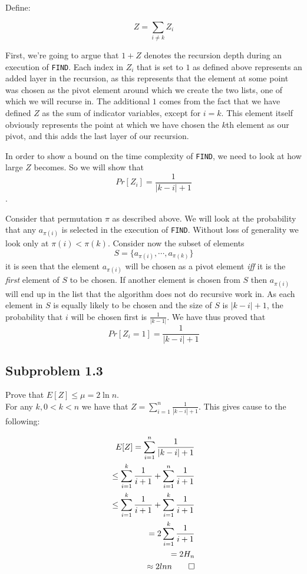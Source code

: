 \documentclass[article,a4paper,oneside]{memoir}
\newcommand{\+}[1]{\ensuremath{\boldsymbol{#1}}}
\begin{document}
Define:

$$Z=\sum_{i\neq k} Z_i$$

First, we're going to argue that $1+Z$ denotes the recursion depth during an execution of \texttt{FIND}. Each index in $Z_i$ that is set to $1$ as defined above represents an added layer in the recursion, as this represents that the element at some point was chosen as the pivot element around which we create the two lists, one of which we will recurse in. The additional $1$ comes from the fact that we have defined $Z$ as the sum of indicator variables, except for $i=k$. This element itself obviously represents the point at which we have chosen the $k$th element as our pivot, and this adds the last layer of our recursion.
\par
In order to show a bound on the time complexity of \texttt{FIND}, we need to look at how large $Z$ becomes. So we will show that $$Pr[Z_{i}]=\frac{1}{|k-i|+1}$$.
\par
Consider that permutation $\pi$ as described above. We will look at the probability that any $a_{\pi(i)}$ is selected in the execution of \texttt{FIND}. Without loss of generality we look only at $\pi(i) < \pi(k)$. Consider now the subset of elements $$S = \lbrace a_{\pi(i)},\cdots,a_{\pi(k)}\rbrace$$ it is seen that the element $a_{\pi(i)}$ will be chosen as a pivot element \emph{iff} it is the \emph{first} element of $S$ to be chosen. If another element is chosen from $S$ then $a_{\pi(i)}$ will end up in the list that the algorithm does not do recursive work in. As each element in $S$ is equally likely to be chosen and the size of $S$ is $|k - i| + 1$, the probability that $i$ will be chosen first is $\frac{1}{|k -1|}$. We have thus proved that $$Pr[Z_{i} = 1] = \frac{1}{|k-i|+1}$$



\subsection{Subproblem 1.3} 
Prove that $E[Z]\leq \mu = 2\ln n$.\\
For any $k, 0<k<n$ we have that $Z = \sum_{i=1}^{n} \frac{1}{|k-i|+1}$.
This gives cause to the following:

\begin{align*}
E[Z] = \sum_{i=1}^{n} \frac{1}{|k-i|+1}
\\ \leq \sum_{i=1}^{k} \frac{1}{i+1} + \sum_{i=1}^{n} \frac{1}{i+1}
\\ \leq \sum_{i=1}^{k} \frac{1}{i+1} + \sum_{i=1}^{k} \frac{1}{i+1}
\\ = 2\sum_{i=1}^{k} \frac{1}{i+1}
\\ = 2H_n
\\ \approx 2lnn \qedhere
\end{align*}
\end{document}

